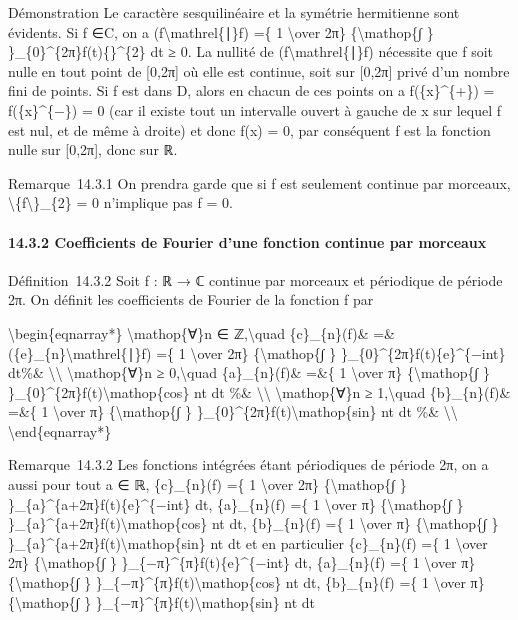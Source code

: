 \documentclass[]{article}
\begin{document}
Démonstration Le caractère sesquilinéaire et la symétrie hermitienne
sont évidents. Si f ∈C, on a (f\textbackslash{}mathrel\{∣\}f) =\{ 1
\textbackslash{}over 2π\} \{\textbackslash{}mathop\{∫ \}
\}\_\{0\}\^{}\{2π\}\textbar{}f(t)\{\textbar{}\}\^{}\{2\} dt ≥ 0. La
nullité de (f\textbackslash{}mathrel\{∣\}f) nécessite que f soit nulle
en tout point de {[}0,2π{]} où elle est continue, soit sur {[}0,2π{]}
privé d'un nombre fini de points. Si f est dans D, alors en chacun de
ces points on a f(\{x\}\^{}\{+\}) = f(\{x\}\^{}\{−\}) = 0 (car il existe
tout un intervalle ouvert à gauche de x sur lequel f est nul, et de même
à droite) et donc f(x) = 0, par conséquent f est la fonction nulle sur
{[}0,2π{]}, donc sur ℝ.

Remarque~14.3.1 On prendra garde que si f est seulement continue par
morceaux,
\textbackslash{}\textbar{}\{f\textbackslash{}\textbar{}\}\_\{2\} = 0
n'implique pas f = 0.

\paragraph{14.3.2 Coefficients de Fourier d'une fonction continue par
morceaux}

Définition~14.3.2 Soit f : ℝ → ℂ continue par morceaux et périodique de
période 2π. On définit les coefficients de Fourier de la fonction f par

\textbackslash{}begin\{eqnarray*\} \textbackslash{}mathop\{∀\}n ∈
ℤ,\textbackslash{}quad \{c\}\_\{n\}(f)\& =\&
(\{e\}\_\{n\}\textbackslash{}mathrel\{∣\}f) =\{ 1 \textbackslash{}over
2π\} \{\textbackslash{}mathop\{∫ \}
\}\_\{0\}\^{}\{2π\}f(t)\{e\}\^{}\{−int\} dt\%\&
\textbackslash{}\textbackslash{} \textbackslash{}mathop\{∀\}n ≥
0,\textbackslash{}quad \{a\}\_\{n\}(f)\& =\&\{ 1 \textbackslash{}over
π\} \{\textbackslash{}mathop\{∫ \}
\}\_\{0\}\^{}\{2π\}f(t)\textbackslash{}mathop\{cos\} nt dt \%\&
\textbackslash{}\textbackslash{} \textbackslash{}mathop\{∀\}n ≥
1,\textbackslash{}quad \{b\}\_\{n\}(f)\& =\&\{ 1 \textbackslash{}over
π\} \{\textbackslash{}mathop\{∫ \}
\}\_\{0\}\^{}\{2π\}f(t)\textbackslash{}mathop\{sin\} nt dt \%\&
\textbackslash{}\textbackslash{} \textbackslash{}end\{eqnarray*\}

Remarque~14.3.2 Les fonctions intégrées étant périodiques de période 2π,
on a aussi pour tout a ∈ ℝ, \{c\}\_\{n\}(f) =\{ 1 \textbackslash{}over
2π\} \{\textbackslash{}mathop\{∫ \}
\}\_\{a\}\^{}\{a+2π\}f(t)\{e\}\^{}\{−int\} dt, \{a\}\_\{n\}(f) =\{ 1
\textbackslash{}over π\} \{\textbackslash{}mathop\{∫ \}
\}\_\{a\}\^{}\{a+2π\}f(t)\textbackslash{}mathop\{cos\} nt dt,
\{b\}\_\{n\}(f) =\{ 1 \textbackslash{}over π\}
\{\textbackslash{}mathop\{∫ \}
\}\_\{a\}\^{}\{a+2π\}f(t)\textbackslash{}mathop\{sin\} nt dt et en
particulier \{c\}\_\{n\}(f) =\{ 1 \textbackslash{}over 2π\}
\{\textbackslash{}mathop\{∫ \} \}\_\{−π\}\^{}\{π\}f(t)\{e\}\^{}\{−int\}
dt, \{a\}\_\{n\}(f) =\{ 1 \textbackslash{}over π\}
\{\textbackslash{}mathop\{∫ \}
\}\_\{−π\}\^{}\{π\}f(t)\textbackslash{}mathop\{cos\} nt dt,
\{b\}\_\{n\}(f) =\{ 1 \textbackslash{}over π\}
\{\textbackslash{}mathop\{∫ \}
\}\_\{−π\}\^{}\{π\}f(t)\textbackslash{}mathop\{sin\} nt dt
\end{document}
